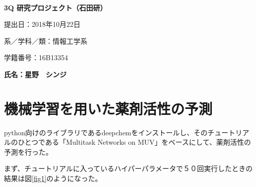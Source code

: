 \documentclass[a4j,11pt]{jarticle}
\begin{document}
\begin{center}
　\vspace{10mm}

{\bf {\huge 3Q 研究プロジェクト（石田研）}}

\vspace{80mm}

提出日：2018年10月22日

\vspace{10mm}

系／学科／類：情報工学系

\vspace{10mm}

学籍番号：16B13354

\vspace{20mm}

{\bf {\LARGE 氏名：星野　シンジ}}
\end{center}

\newpage

\section{機械学習を用いた薬剤活性の予測}

python向けのライブラリであるdeepchemをインストールし、そのチュートリアルのひとつである「Multitask Networks on MUV」をベースにして、薬剤活性の予測を行った。

まず、チュートリアルに入っているハイパーパラメータで５０回実行したときの結果は図\ref{fig1}のようになった。
\end{document}
